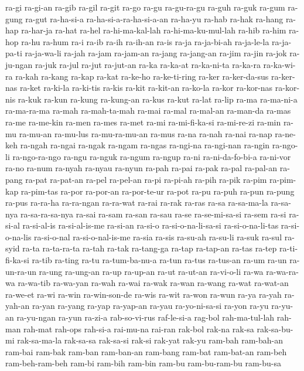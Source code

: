 {ra-gi ra-gi-an ra-gib ra-gil ra-git ra-go ra-gu ra-gu-ra-gu ra-guh ra-guk
ra-gum ra-gung ra-gut ra-ha-si-a ra-ha-si-a-ra-ha-si-a-an ra-ha-yu ra-hab
ra-hak ra-hang ra-hap ra-har-ja ra-hat ra-hel ra-hi-ma-kal-lah
ra-hi-ma-ku-mul-lah ra-hib ra-him ra-hop ra-hu ra-hum ra-i ra-ib ra-ih
ra-ih-an ra-is ra-ja ra-ja-bi-ah ra-ja-le-la ra-ja-pa-ti ra-ja-wa-li
ra-jah ra-jam ra-jam-an ra-jang ra-jang-an ra-jim ra-jin ra-jok ra-ju-ngan
ra-juk ra-jul ra-jut ra-jut-an ra-ka ra-ka-at ra-ka-ni-ta ra-ka-ra
ra-ka-wi-ra ra-kah ra-kang ra-kap ra-kat ra-ke-ho ra-ke-ti-ring ra-ker
ra-ker-da-sus ra-ker-nas ra-ket ra-ki-la ra-ki-tis ra-kis ra-kit ra-kit-an
ra-ko-la ra-kor ra-kor-nas ra-kor-nis ra-kuk ra-kun ra-kung ra-kung-an
ra-kus ra-kut ra-lat ra-lip ra-ma ra-ma-ni-a ra-ma-ra-ma ra-mah
ra-mah-ta-mah ra-mai ra-mal ra-mal-an ra-man-da ra-mas ra-me ra-me-kin
ra-men ra-mes ra-met ra-mi ra-mi-fi-ka-si ra-mi-re-zi ra-min ra-mu
ra-mu-an ra-mu-lus ra-mu-ra-mu-an ra-mus ra-na ra-nah ra-nai ra-nap
ra-ne-keh ra-ngah ra-ngai ra-ngak ra-ngam ra-ngas ra-ngi-na ra-ngi-nan
ra-ngin ra-ngo-li ra-ngo-ra-ngo ra-ngu ra-nguk ra-ngum ra-ngup ra-ni
ra-ni-da-fo-bi-a ra-ni-vor ra-no ra-num ra-nyah ra-nyau ra-nyun ra-pah
ra-pai ra-pak ra-pal ra-pal-an ra-pang ra-pat ra-pat-an ra-pel ra-pel-an
ra-pi ra-pi-ah ra-pih ra-pik ra-pim ra-pim-kap ra-pim-tas ra-por ra-por-an
ra-por-te-ur ra-pot ra-pu ra-puh ra-pun ra-pung ra-pus ra-ra-ha ra-ra-ngan
ra-ra-wat ra-rai ra-rak ra-ras ra-sa ra-sa-ma-la ra-sa-nya ra-sa-ra-sa-nya
ra-sai ra-sam ra-san ra-sau ra-se ra-se-mi-sa-si ra-sem ra-si ra-si-al
ra-si-al-is ra-si-al-is-me ra-si-an ra-si-o ra-si-o-na-li-sa-si
ra-si-o-na-li-tas ra-si-o-na-lis ra-si-o-nal ra-si-o-nal-is-me ra-sia
ra-sis ra-su-ah ra-su-li ra-suk ra-sul ra-syid ra-ta ra-ta-ra-ta ra-tah
ra-tak ra-tang-ga ra-tap ra-tap-an ra-tas ra-tep ra-ti-fi-ka-si ra-tib
ra-ting ra-tu ra-tum-ba-nu-a ra-tun ra-tus ra-tus-an ra-um ra-un
ra-un-ra-un ra-ung ra-ung-an ra-up ra-up-an ra-ut ra-ut-an ra-vi-o-li
ra-wa ra-wa-ra-wa ra-wa-tib ra-wa-yan ra-wah ra-wai ra-wak ra-wan ra-wang
ra-wat ra-wat-an ra-we-et ra-wi ra-win ra-win-son-de ra-wis ra-wit ra-won
ra-wun ra-ya ra-yah ra-yah-an ra-yan ra-yang ra-yap ra-yap-an ra-yau
ra-yo-ni-sa-si ra-yon ra-yu ra-yu-an ra-yu-ngan ra-yun ra-zi-a
rab-so-vi-rus raf-le-si-a rag-bol rah-ma-tul-lah rah-man rah-mat rah-ops
rah-si-a rai-mu-na rai-ran rak-bol rak-na rak-sa rak-sa-bu-mi rak-sa-ma-la
rak-sa-sa rak-sa-si rak-si rak-yat rak-yu ram-bah ram-bah-an ram-bai
ram-bak ram-ban ram-ban-an ram-bang ram-bat ram-bat-an ram-beh
ram-beh-ram-beh ram-bi ram-bih ram-bin ram-bu ram-bu-ram-bu ram-bu-sa
}
